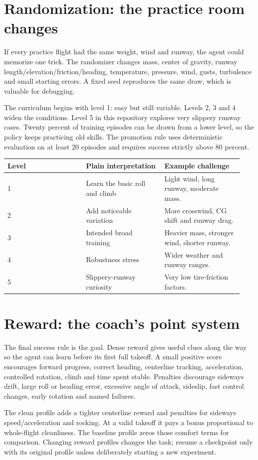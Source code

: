 \documentclass[11pt,a4paper]{article}
\begin{document}
\section{Randomization: the practice room changes}
If every practice flight had the same weight, wind and runway, the agent could memorize one trick. The randomizer changes mass, center of gravity, runway length/elevation/friction/heading, temperature, pressure, wind, gusts, turbulence and small starting errors. A fixed seed reproduces the same draw, which is valuable for debugging.

The curriculum begins with level 1: easy but still variable. Levels 2, 3 and 4 widen the conditions. Level 5 in this repository explores very slippery runway cases. Twenty percent of training episodes can be drawn from a lower level, so the policy keeps practicing old skills. The promotion rule uses deterministic evaluation on at least 20 episodes and requires success strictly above 80 percent.

\begin{longtable}{|p{0.313\linewidth}|p{0.313\linewidth}|p{0.313\linewidth}|}\hline
Level & Plain interpretation & Example challenge \\ \hline
1 & Learn the basic roll and climb & Light wind, long runway, moderate mass. \\ \hline
2 & Add noticeable variation & More crosswind, CG shift and runway drag. \\ \hline
3 & Intended broad training & Heavier mass, stronger wind, shorter runway. \\ \hline
4 & Robustness stress & Wider weather and runway ranges. \\ \hline
5 & Slippery-runway curiosity & Very low tire-friction factors. \\ \hline
\end{longtable}
\section{Reward: the coach's point system}
The final success rule is the goal. Dense reward gives useful clues along the way so the agent can learn before its first full takeoff. A small positive score encourages forward progress, correct heading, centerline tracking, acceleration, controlled rotation, climb and time spent stable. Penalties discourage sideways drift, large roll or heading error, excessive angle of attack, sideslip, fast control changes, early rotation and named failures.

The clean profile adds a tighter centerline reward and penalties for sideways speed/acceleration and rocking. At a valid takeoff it pays a bonus proportional to whole-flight cleanliness. The baseline profile zeros those comfort terms for comparison. Changing reward profiles changes the task; resume a checkpoint only with its original profile unless deliberately starting a new experiment.
\end{document}
